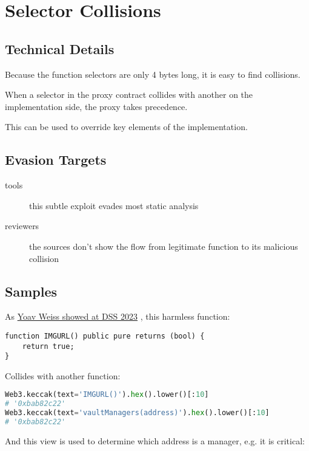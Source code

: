\section{Selector Collisions} \label{sec:selector-collisions}

\subsection{Technical Details}

Because the function selectors are only 4 bytes long, it is easy to find collisions.

When a selector in the proxy contract collides with another on the implementation side, the proxy takes precedence.

This can be used to override key elements of the implementation.

\subsection{Evasion Targets}

\begin{description}
\item[tools]{this subtle exploit evades most static analysis}
\item[reviewers]{the sources don't show the flow from legitimate function to its malicious collision}
\end{description}

\subsection{Samples}

As \href{https://www.youtube.com/watch?v=l1wjRy2BYPg}{Yoav Weiss showed at DSS 2023} \cite{video-masquerading-code}, this harmless function:

\begin{lstlisting}[language=Solidity]
function IMGURL() public pure returns (bool) {
    return true;
}
\end{lstlisting}

Collides with another function:

\begin{lstlisting}[language=Python]
Web3.keccak(text='IMGURL()').hex().lower()[:10]
# '0xbab82c22'
Web3.keccak(text='vaultManagers(address)').hex().lower()[:10]
# '0xbab82c22'
\end{lstlisting}

And this view is used to determine which address is a manager, e.g. it is critical:

